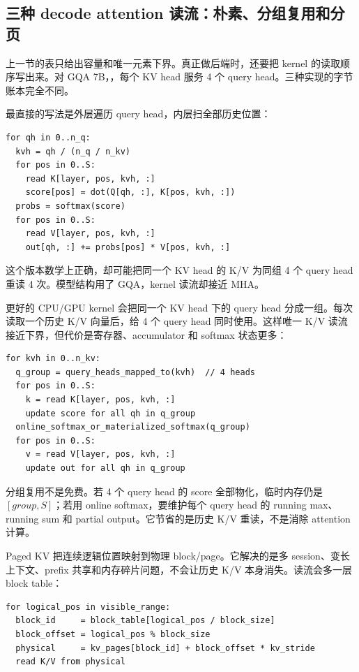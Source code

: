 \subsection{三种 decode attention 读流：朴素、分组复用和分页}

上一节的表只给出容量和唯一元素下界。真正做后端时，还要把 kernel 的读取顺序写出来。对 GQA 7B，，每个 KV head 服务 4 个 query head。三种实现的字节账本完全不同。

 最直接的写法是外层遍历 query head，内层扫全部历史位置：

\begin{lstlisting}[numbers=none,caption={朴素 GQA decode attention 读流}]
for qh in 0..n_q:
  kvh = qh / (n_q / n_kv)
  for pos in 0..S:
    read K[layer, pos, kvh, :]
    score[pos] = dot(Q[qh, :], K[pos, kvh, :])
  probs = softmax(score)
  for pos in 0..S:
    read V[layer, pos, kvh, :]
    out[qh, :] += probs[pos] * V[pos, kvh, :]
\end{lstlisting}

这个版本数学上正确，却可能把同一个 KV head 的 K/V 为同组 4 个 query head 重读 4 次。模型结构用了 GQA，kernel 读流却接近 MHA。

 更好的 CPU/GPU kernel 会把同一个 KV head 下的 query head 分成一组。每次读取一个历史 K/V 向量后，给 4 个 query head 同时使用。这样唯一 K/V 读流接近下界，但代价是寄存器、accumulator 和 softmax 状态更多：

\begin{lstlisting}[numbers=none,caption={按 KV head 分组的读流}]
for kvh in 0..n_kv:
  q_group = query_heads_mapped_to(kvh)  // 4 heads
  for pos in 0..S:
    k = read K[layer, pos, kvh, :]
    update score for all qh in q_group
  online_softmax_or_materialized_softmax(q_group)
  for pos in 0..S:
    v = read V[layer, pos, kvh, :]
    update out for all qh in q_group
\end{lstlisting}

分组复用不是免费。若 4 个 query head 的 score 全部物化，临时内存仍是 \([group,S]\)；若用 online softmax，要维护每个 query head 的 running max、running sum 和 partial output。它节省的是历史 K/V 重读，不是消除 attention 计算。

 Paged KV 把连续逻辑位置映射到物理 block/page。它解决的是多 session、变长上下文、prefix 共享和内存碎片问题，不会让历史 K/V 本身消失。读流会多一层 block table：

\begin{lstlisting}[numbers=none,caption={paged KV 的额外地址流}]
for logical_pos in visible_range:
  block_id     = block_table[logical_pos / block_size]
  block_offset = logical_pos % block_size
  physical     = kv_pages[block_id] + block_offset * kv_stride
  read K/V from physical
\end{lstlisting}

